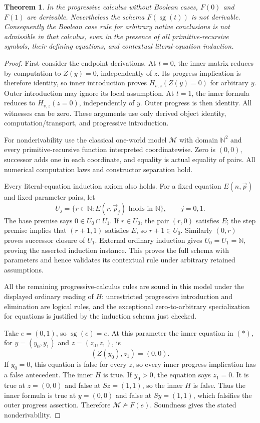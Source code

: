 \documentclass[11pt,letterpaper]{article}
\newtheorem{theorem}{Theorem}[section]
\theoremstyle{definition}\newtheorem{definition}[theorem]{Definition}
\theoremstyle{remark}\newtheorem{remark}[theorem]{Remark}
\begin{document}
\begin{theorem}
In the progressive calculus without Boolean cases, $F(0)$ and $F(1)$
are derivable. Nevertheless the schema $F(\operatorname{sg}(t))$ is not
derivable. Consequently the Boolean case rule for arbitrary native
conclusions is not admissible in that calculus, even in the presence of
all primitive-recursive symbols, their defining equations, and contextual
literal-equation induction.
\end{theorem}
\begin{proof}
First consider the endpoint derivations. At $t=0$, the inner matrix
reduces by computation to $Z(y)=0$, independently of $z$. Its progress
implication is therefore identity, so inner introduction proves
$H_{v,z}(Z(y)=0)$ for arbitrary $y$. Outer introduction may ignore its
local assumption. At $t=1$, the inner formula reduces to
$H_{v,z}(z=0)$, independently of $y$. Outer progress is then identity.
All witnesses can be zero. These arguments use only derived object identity,
computation/transport, and progressive introduction.

For nonderivability use the classical one-world model $\mathcal M$ with
domain $\mathbb N^2$ and every primitive-recursive function interpreted
coordinatewise. Zero is $(0,0)$, successor adds one in each coordinate,
and equality is actual equality of pairs. All numerical computation
laws and constructor separation hold.

Every literal-equation induction axiom also holds. For a fixed equation
$E(n,\vec p)$ and fixed parameter pairs, let
\[
 U_j=\{r\in\mathbb N:E(r,\vec p_j)\text{ holds in }\mathbb N\},
 \qquad j=0,1.
\]
The base premise says $0\in U_0\cap U_1$. If $r\in U_0$, the pair
$(r,0)$ satisfies $E$; the step premise implies that $(r+1,1)$ satisfies
$E$, so $r+1\in U_0$. Similarly $(0,r)$ proves successor closure of
$U_1$. External ordinary induction gives $U_0=U_1=\mathbb N$, proving
the asserted induction instance. This proves the full schema with
parameters and hence validates its contextual rule under arbitrary
retained assumptions.

All the remaining progressive-calculus rules are sound in this model
under the displayed ordinary reading of $H$: unrestricted progressive
introduction and elimination are logical rules, and the exceptional
zero-to-arbitrary specialization for equations is justified by the
induction schema just checked.

Take $e=(0,1)$, so $\operatorname{sg}(e)=e$. At this parameter the
inner equation in $(*)$, for $y=(y_0,y_1)$ and $z=(z_0,z_1)$, is
\[
                    (Z(y_0),z_1)=(0,0).
\]
If $y_0=0$, this equation is false for every $z$, so every inner
progress implication has a false antecedent. The inner $H$ is true.
If $y_0>0$, the equation says $z_1=0$. It is true at $z=(0,0)$ and
false at $Sz=(1,1)$, so the inner $H$ is false. Thus the inner formula
is true at $y=(0,0)$ and false at $Sy=(1,1)$, which falsifies the
outer progress assertion. Therefore $\mathcal M\not\models F(e)$.
Soundness gives the stated nonderivability.


\end{proof}
\end{document}
